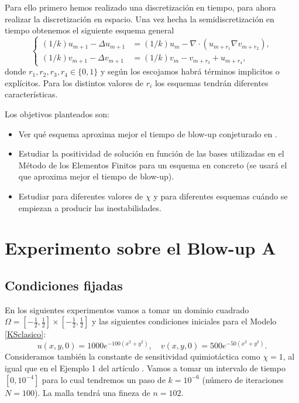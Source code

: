 \documentclass[a4paper,12pt]{article}
\begin{document}
Para ello primero hemos realizado una discretización en tiempo, para ahora realizar la discretización en espacio. Una vez hecha la semidiscretización en tiempo obtenemos el siguiente esquema general 
\begin{equation}
\left\{
\begin{array}{lll}
\label{KSSchgeneral}
(1/k) u_{m+1} - \Delta u_{m+1} &= (1/k) u_m -  \nabla \cdot (u_{m+r_1} \nabla v_{m+r_2}),
\\
(1/k) v_{m+1} - \Delta v_{m+1} &= (1/k) v_m - v_{m+r_3} + u_{m+r_4},
\end{array}
\right.
\end{equation}
donde $r_1,r_2,r_3,r_4\in\{0,1\}$ y según los escojamos habrá términos implicitos o explícitos. Para los distintos valores de $r_i$ los esquemas tendrán diferentes características. 

Los objetivos planteados son:  
\begin{itemize}
	\item Ver qué esquema aproxima mejor el tiempo de blow-up conjeturado en \cite{bib:2}.
	\item Estudiar la positividad de solución en función de las bases utilizadas en el Método de los Elementos Finitos para un esquema en concreto (se usará el que aproxima mejor el tiempo de blow-up).
	\item Estudiar para diferentes valores de $\chi$ y para diferentes esquemas cuándo se empiezan a producir las inestabilidades. 
\end{itemize}

\section{Experimento sobre el Blow-up A}
\label{A}
\subsection{Condiciones fijadas}
En los siguientes experimentos vamos a tomar un dominio cuadrado $\Omega=[-\frac{1}{2},\frac{1}{2}]\times[-\frac{1}{2},\frac{1}{2}]$ y las siguientes condiciones iniciales para el Modelo \ref{KSclasico}:
\begin{equation}
u(x,y,0)=1000e^{-100(x^2+y^2)}, \quad v(x,y,0)=500e^{-50(x^2+y^2)}.
\end{equation}
Consideramos también la constante de sensitividad quimiotáctica como $\chi=1$, al igual que en el Ejemplo 1 del artículo \cite{bib:2}. Vamos a tomar un intervalo de tiempo $[0,10^{-4}]$ para lo cual tendremos un paso de $k=10^{-6}$ (número de iteraciones $N=100$). La malla tendrá una fineza de $n=102$. 
\end{document}

